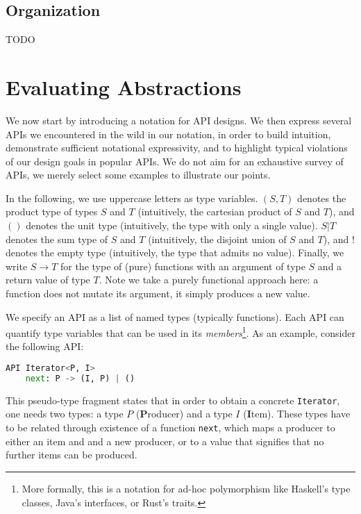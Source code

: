 \documentclass[sigplan,screen,10pt,anonymous,review]{acmart}
\begin{document}
\subsection{Organization}

TODO


\section{Evaluating Abstractions}\label{evaluating_others}

We now start by introducing a notation for API designs. We then express several APIs we encountered in the wild in our notation, in order to build intuition, demonstrate sufficient notational expressivity, and to highlight typical violations of our design goals in popular APIs. We do not aim for an exhaustive survey of APIs, we merely select some examples to illustrate our points.

In the following, we use uppercase letters as type variables. $(S, T)$ denotes the product type of types $S$ and $T$ (intuitively, the cartesian product of $S$ and $T$), and $()$ denotes the unit type (intuitively, the type with only a single value). $S | T$ denotes the sum type of $S$ and $T$ (intuitively, the disjoint union of $S$ and $T$), and $!$ denotes the empty type (intuitively, the type that admits no value). Finally, we write $S \rightarrow T$ for the type of (pure) functions with an argument of type $S$ and a return value of type $T$. Note we take a purely functional approach here: a function does not mutate its argument, it simply produces a new value.

We specify an API as a list of named types (typically functions). Each API can quantify type variables that can be used in its \textit{members}\footnote{More formally, this is a notation for ad-hoc polymorphism like Haskell's type classes, Java's interfaces, or Rust's traits.}. As an example, consider the following API:

\begin{lstlisting}[language=Python]
API Iterator<P, I>
    next: P -> (I, P) | ()
\end{lstlisting}

This pseudo-type fragment states that in order to obtain a concrete \texttt{Iterator}, one needs two types: a type $P$ (\textbf{P}roducer) and a type $I$ (\textbf{I}tem). These types have to be related through existence of a function \texttt{next}, which maps a producer to either an item and and a new producer, or to a value that signifies that no further items can be produced.
\end{document}
